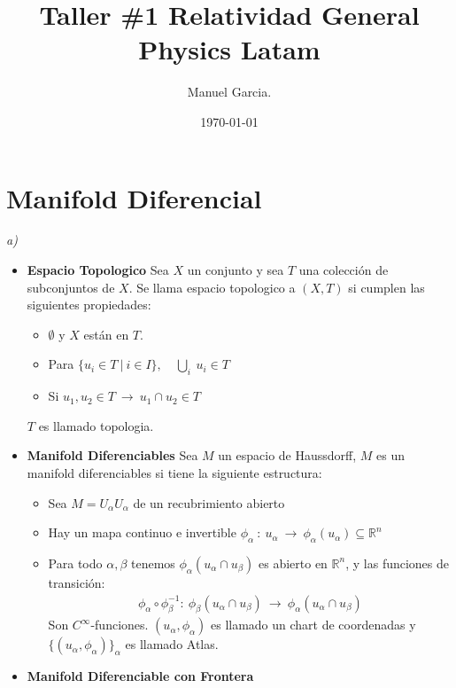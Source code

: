 \documentclass{article}
\title{Taller \#1 Relatividad General Physics Latam }
\author{Manuel Garcia.}
\date{\today}
\begin{document}
\maketitle

\section{Manifold Diferencial}
\textit{a)} 
\begin{itemize}
  \item \textbf{Espacio Topologico } Sea $ X  $ un conjunto y sea $ T  $ una colección de subconjuntos de $ X  $. Se llama espacio topologico a $ (X,T) $ si cumplen las siguientes propiedades:
    \begin{itemize}
      \item $ \emptyset $ y $ X  $ están en $ T  $.
      \item Para $ \{u_i \in T \ | \ i\in I \}, \quad \underset{i }{\bigcup}\  u_i \in T $
      \item Si $ u_1,u_2 \in T \ \rightarrow \ u_1 \cap u_2 \in T $
    \end{itemize}
    $ T  $ es llamado topologia.
  \item \textbf{Manifold Diferenciables } Sea $ M $ un espacio de Haussdorff, $ M  $ es un manifold diferenciables si tiene la siguiente estructura:
    \begin{itemize}
      \item Sea $ M = U_\alpha U_\alpha $ de un recubrimiento abierto
      \item Hay un mapa continuo e invertible $ \phi_\alpha \ : \ u_\alpha \ \rightarrow \ \phi_\alpha(u_\alpha) \subseteq \mathbb{R}^n $
      \item Para todo $ \alpha,\beta $ tenemos $ \phi_\alpha(u_\alpha\cap u_\beta) $ es abierto en $ \mathbb{R}^n  $, y las funciones de transición: 
        \begin{gather*}
          \phi_\alpha \circ \phi_\beta ^ {-1 }: \ \phi_\beta(u_\alpha \cap u_\beta) \ \rightarrow \ \phi_\alpha(u_\alpha \cap u_\beta)
        \end{gather*}
        Son $ C^\infty $-funciones. $ (u_\alpha, \phi_\alpha) $ es llamado un chart de coordenadas y $ \{(u_\alpha, \phi_\alpha)\}_\alpha $ es llamado Atlas.
    \end{itemize}
  \item \textbf{Manifold Diferenciable con Frontera} 
\end{itemize}
\end{document}
